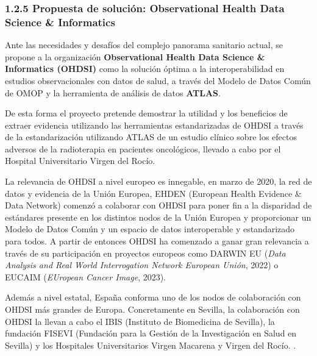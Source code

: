\subsubsection{1.2.5 Propuesta de solución: Observational Health Data Science \& Informatics}

Ante las necesidades y desafíos del complejo panorama sanitario actual, se propone a la organización \textbf{Observational Health Data Science \& Informatics (OHDSI)} como la solución óptima a la interoperabilidad en estudios observacionales con datos de salud, a través del Modelo de Datos Común de OMOP y la herramienta de análisis de datos \textbf{ATLAS}. 

De esta forma el proyecto pretende demostrar la utilidad y los beneficios de extraer evidencia utilizando las herramientas estandarizadas de OHDSI a través de la estandarización utilizando ATLAS de un estudio clínico sobre los efectos adversos de la radioterapia en pacientes oncológicos, llevado a cabo por el Hospital Universitario Virgen del Rocío.

La relevancia de OHDSI a nivel europeo es innegable, en marzo de 2020, la red de datos y evidencia de la Unión Europea, EHDEN (European Health Evidence \& Data Network) comenzó a colaborar con OHDSI para poner fin a la disparidad de estándares presente en los distintos nodos de la Unión Europea y proporcionar un Modelo de Datos Común y un espacio de datos interoperable y estandarizado para todos. A partir de entonces OHDSI ha comenzado a ganar gran relevancia a través de su participación en proyectos europeos como DARWIN EU (\textit{Data Analysis and Real World Interrogation Network European Unión}, 2022) \parencite{OHDSI2023Darwin} %
o EUCAIM (\textit{EUropean Cancer Image}, 2023).%

Además a nivel estatal, España conforma uno de los nodos de colaboración con OHDSI más grandes de Europa. %
Concretamente en Sevilla, la colaboración con OHDSI la llevan a cabo el IBIS (Instituto de Biomedicina de Sevilla), la fundación FISEVI (Fundación para la Gestión de la Investigación en Salud en Sevilla) y los Hospitales Universitarios Virgen Macarena y Virgen del Rocío. . %


